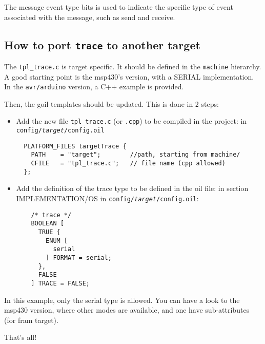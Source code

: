 The message event type bits is used to indicate the specific type of event associated with the message, such as send and receive.

\subsection{How to port \texttt{trace} to another target}

The \texttt{tpl\_trace.c} is target specific. It should be defined in the \lstinline{machine} hierarchy. A good starting point is the msp430's version, with a SERIAL implementation. In the \texttt{avr/arduino} version, a C++ example is provided.

Then, the goil templates should be updated. This is done in 2 steps:

\begin{itemize}
	\item Add the new file \texttt{tpl\_trace.c} (or \texttt{.cpp}) to be compiled in the project: in \texttt{config/\textit{target}/config.oil} \\
\begin{lstlisting}
  PLATFORM_FILES targetTrace {
    PATH    = "target";        //path, starting from machine/
    CFILE   = "tpl_trace.c";   // file name (cpp allowed)
  };
\end{lstlisting}

	\item Add the definition of the trace type to be defined in the oil file: in section IMPLEMENTATION/OS in \texttt{config/\textit{target}/config.oil}:
\begin{lstlisting}
    /* trace */
    BOOLEAN [
      TRUE {
        ENUM [
          serial
        ] FORMAT = serial;
      },
      FALSE
    ] TRACE = FALSE;
\end{lstlisting}
\end{itemize}

In this example, only the serial type is allowed. You can have a look to the msp430 version, where other modes are available, and one have sub-attributes (for fram target).

That's all!
